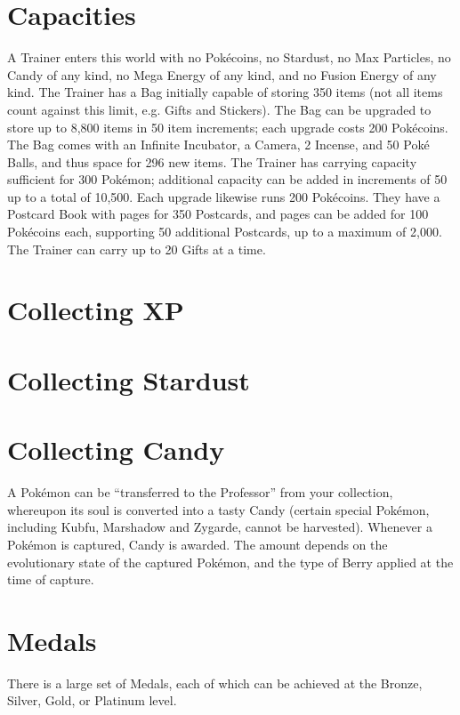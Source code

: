 \section{Capacities}
A Trainer enters this world with no Pokécoins, no Stardust, no Max Particles,
  no Candy of any kind, no Mega Energy of any kind, and no Fusion Energy of any
  kind.
The Trainer has a Bag initially capable of storing 350 items (not all items
  count against this limit, e.g. Gifts and Stickers).
The Bag can be upgraded to store up to 8,800 items in 50 item increments;
  each upgrade costs 200 Pokécoins.
The Bag comes with an Infinite Incubator, a Camera, 2 Incense, and 50 Poké Balls,
  and thus space for 296 new items.
The Trainer has carrying capacity sufficient for 300 Pokémon; additional
  capacity can be added in increments of 50 up to a total of 10,500.
Each upgrade likewise runs 200 Pokécoins.
They have a Postcard Book with pages for 350 Postcards, and pages can be
 added for 100 Pokécoins each, supporting 50 additional Postcards, up
 to a maximum of 2,000.
The Trainer can carry up to 20 Gifts at a time.

\section{Collecting XP}

\section{Collecting Stardust}

\section{Collecting Candy}
A Pokémon can be ``transferred to the Professor'' from your collection,
 whereupon its soul is converted into a tasty Candy (certain special
 Pokémon, including Kubfu, Marshadow and Zygarde, cannot be harvested).
Whenever a Pokémon is captured, Candy is awarded. The amount depends on
 the evolutionary state of the captured Pokémon, and the type of Berry
 applied at the time of capture.

\section{Medals}
There is a large set of Medals, each of which can be achieved at the Bronze,
 Silver, Gold, or Platinum level.

